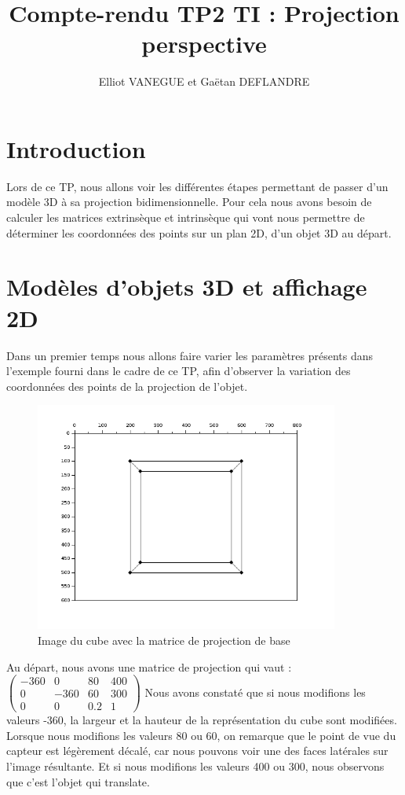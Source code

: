 \documentclass[a4paper,11pt]{article}
\title{Compte-rendu TP2 TI : Projection perspective}
\author{Elliot VANEGUE et Gaëtan DEFLANDRE}
\begin{document}


  \maketitle
  
  \mbox{}
  \newpage
  \clearpage
  
  \section*{Introduction}
  Lors de ce TP, nous allons voir les différentes étapes permettant de passer d'un
  modèle 3D à sa projection bidimensionnelle. Pour cela nous avons besoin de calculer les matrices 
  extrinsèque et intrinsèque qui vont nous permettre de déterminer les coordonnées des points
  sur un plan 2D, d'un objet 3D au départ.
  
  \section{Modèles d'objets 3D et affichage 2D}
  Dans un premier temps nous allons faire varier les paramètres présents dans l'exemple fourni
  dans le cadre de ce TP, afin d'observer la variation des coordonnées des points de la projection de l'objet.\\
  
  \begin{figure}[H]
    \center
    \includegraphics[width=10cm]{Projection1.png}
    \caption{Image du cube avec la matrice de projection de base}
  \end{figure}

  
  Au départ, nous avons une matrice de projection qui vaut : 
  $\begin{pmatrix}
   -360 & 0 & 80 & 400 \\
   0 & -360 & 60 & 300 \\
   0 & 0 & 0.2 & 1
  \end{pmatrix}$
  Nous avons constaté que si nous modifions les valeurs -360, la largeur et la hauteur de la représentation du cube sont modifiées.
  Lorsque nous modifions les valeurs 80 ou 60, on remarque que le point de vue du capteur est légèrement décalé, car nous pouvons 
  voir une des faces latérales sur l'image résultante. Et si nous modifions les valeurs 400 ou 300, nous observons que c'est l'objet qui translate.\\
  
\end{document}
